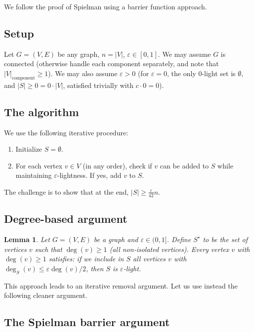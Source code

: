 \documentclass[12pt]{article}
\newtheorem{lemma}[theorem]{Lemma}
\begin{document}
We follow the proof of Spielman \cite{Spielman2015} using a barrier function approach.

\subsection{Setup}

Let $G = (V, E)$ be any graph, $n = |V|$, $\varepsilon \in [0,1]$. We may assume $G$ is connected (otherwise handle each component separately, and note that $|V|_{\text{component}} \geq 1$). We may also assume $\varepsilon > 0$ (for $\varepsilon = 0$, the only $0$-light set is $\emptyset$, and $|S| \geq 0 = 0 \cdot |V|$, satisfied trivially with $c \cdot 0 = 0$).

\subsection{The algorithm}

We use the following iterative procedure:

\begin{enumerate}
\item Initialize $S = \emptyset$.
\item For each vertex $v \in V$ (in any order), check if $v$ can be added to $S$ while maintaining $\varepsilon$-lightness. If yes, add $v$ to $S$.
\end{enumerate}

The challenge is to show that at the end, $|S| \geq \frac{\varepsilon}{42}n$.

\subsection{Degree-based argument}

\begin{lemma}\label{lem:degree}
Let $G = (V,E)$ be a graph and $\varepsilon \in (0,1]$. Define $S^\star$ to be the set of vertices $v$ such that $\deg(v) \geq 1$ (all non-isolated vertices). Every vertex $v$ with $\deg(v) \geq 1$ satisfies: if we include in $S$ all vertices $v$ with $\deg_S(v) \leq \varepsilon \deg(v) / 2$, then $S$ is $\varepsilon$-light.
\end{lemma}

This approach leads to an iterative removal argument. Let us use instead the following cleaner argument.

\subsection{The Spielman barrier argument}
\end{document}
